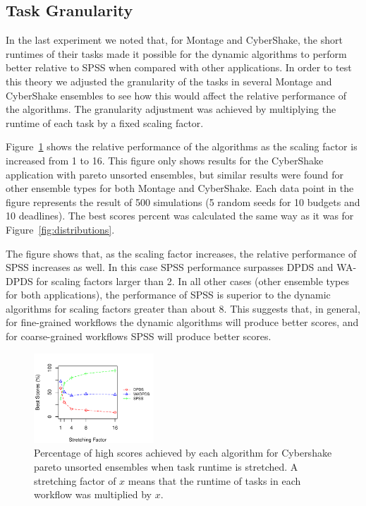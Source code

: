 \documentclass[conference]{IEEEtran}
\begin{document}
\subsection{Task Granularity}

In the last experiment we noted that, for Montage and CyberShake, the short runtimes of their tasks made it possible for the dynamic algorithms to perform better relative to SPSS when compared with other applications. In order to test this theory we adjusted the granularity of the tasks in several Montage and CyberShake ensembles to see how this would affect the relative performance of the algorithms. The granularity adjustment was achieved by multiplying the runtime of each task by a fixed scaling factor.

Figure~\ref{fig:stretching} shows the relative performance of the algorithms as the scaling factor is increased from 1 to 16. This figure only shows results for the CyberShake application with pareto unsorted ensembles, but similar results were found for other ensemble types for both Montage and CyberShake. Each data point in the figure represents the result of 500 simulations (5 random seeds for 10 budgets and 10 deadlines). The best scores percent was calculated the same way as it was for Figure~\ref{fig:distributions}.

The figure shows that, as the scaling factor increases, the relative performance of SPSS increases as well. In this case SPSS performance surpasses DPDS and WA-DPDS for scaling factors larger than 2. In all other cases (other ensemble types for both applications), the performance of SPSS is superior to the dynamic algorithms for scaling factors greater than about 8. This suggests that, in general, for fine-grained workflows the dynamic algorithms will produce better scores, and for coarse-grained workflows SPSS will produce better scores.

\begin{figure}[htb]
    \centering
    \includegraphics[width=0.4\textwidth]{stretching_cybershake}
    \caption[Percentage of high scores achieved by each algorithm for Cybershake pareto unsorted ensembles when task runtime is stretched]{Percentage of high scores achieved by each algorithm for Cybershake pareto unsorted ensembles when task runtime is stretched. A stretching factor of $x$ means that the runtime of tasks in each workflow was multiplied by $x$.}
    \label{fig:stretching}
\end{figure}
\end{document}
